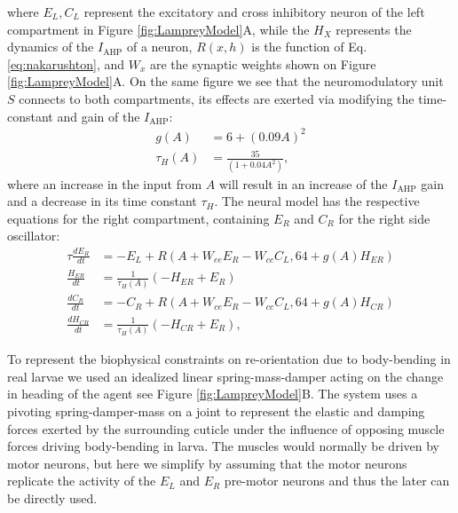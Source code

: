 \documentclass[11pt,a4paper]{article}
\begin{document}
where $E_L, C_L$ represent the excitatory and cross inhibitory neuron of the left compartment in Figure \ref{fig:LampreyModel}A, while the $H_{X}$ represents the dynamics of the $I_{\text{AHP}}$ of a neuron, $R(x,h)$ is the \cite{naka1966s} function of Eq. \eqref{eq:nakarushton}, and $W_x$ are the synaptic weights shown on Figure  \ref{fig:LampreyModel}A. On the same figure we see that the neuromodulatory unit $S$ connects to both compartments, its effects are exerted via modifying the time-constant and gain of the $I_{\text{AHP}}$:
\begin{align}
g(A) &= 6 + \left( 0.09A \right)^2\\
\tau_H(A) &= \frac{35}{(1 + 0.04 A^2)},
\end{align}
where an increase in the input from $A$ will result in an increase of the $I_{\text{AHP}}$ gain and a decrease in its time constant $\tau_H$.
 The neural model has the respective equations for the right compartment, containing  $E_R$ and $C_R$ for the right side oscillator:
\begin{align}
\tau \frac{dE_R}{dt} & = - E_L +  R( A + W_{ee} E_R - W_{cc}C_L, 64 + g(A)H_{ER})\\
\frac{H_{ER}}{dt} &= \frac{1}{\tau_H(A)}(-H_{ER}+E_R)\\
\frac{dC_R}{dt} &= -C_R + R( A + W_{ce}E_R - W_{cc}C_L, 64+g(A)H_{CR})\\
\frac{dH_{CR}}{dt} &= \frac{1}{\tau_H(A)}(-H_{CR}+E_R),
\end{align}

To represent the biophysical constraints on re-orientation due to body-bending in real larvae we  used an idealized linear spring-mass-damper acting on the change in heading of the agent see Figure \ref{fig:LampreyModel}B.
The system uses a pivoting spring-damper-mass on a joint to represent the elastic and damping forces exerted by the surrounding cuticle under the influence of opposing muscle forces driving body-bending in larva.
 The muscles would normally be driven by motor neurons, but here we simplify by assuming that the motor neurons replicate the activity of the $E_L$ and $E_R$ pre-motor neurons and thus the later can be directly used.
\end{document}
